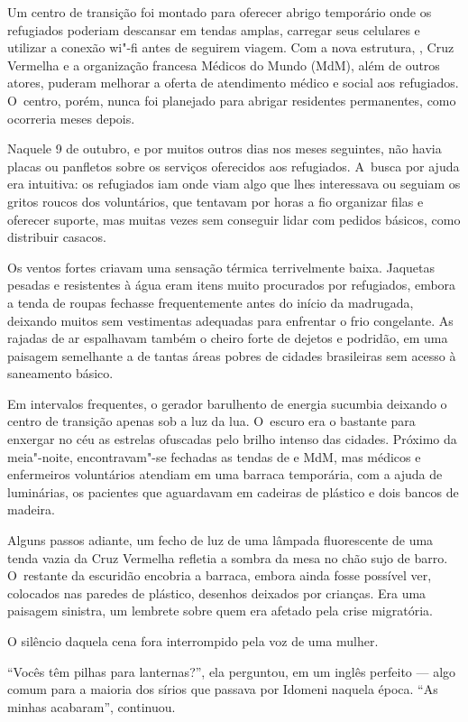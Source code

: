 Um centro de transição foi montado para oferecer abrigo temporário onde
os refugiados poderiam descansar em tendas amplas, carregar
seus celulares e utilizar a conexão wi"-fi antes de seguirem viagem. Com
a nova estrutura, , Cruz Vermelha e a organização francesa Médicos do
Mundo (MdM), além de outros atores, puderam melhorar a oferta de
atendimento médico e social aos refugiados. O~centro, porém, nunca foi
planejado para abrigar residentes permanentes, como ocorreria meses
depois.

Naquele 9 de outubro, e por muitos outros dias nos meses seguintes, não
havia placas ou panfletos sobre os serviços oferecidos aos refugiados. A~busca por ajuda era intuitiva: os refugiados iam onde viam algo que lhes
interessava ou seguiam os gritos roucos dos voluntários, que tentavam
por horas a fio organizar filas e oferecer suporte, mas muitas vezes sem
conseguir lidar com pedidos básicos, como distribuir casacos.

Os ventos fortes criavam uma sensação térmica terrivelmente baixa.
Jaquetas pesadas e resistentes à água eram itens muito procurados por
refugiados, embora a tenda de roupas fechasse frequentemente antes do
início da madrugada, deixando muitos sem vestimentas adequadas para
enfrentar o frio congelante. As rajadas de ar espalhavam também o cheiro
forte de dejetos e podridão, em uma paisagem semelhante a de tantas
áreas pobres de cidades brasileiras sem acesso à saneamento básico.

Em intervalos frequentes, o gerador barulhento de energia sucumbia
deixando o centro de transição apenas sob a luz da lua. O~escuro era o
bastante para enxergar no céu as estrelas ofuscadas pelo brilho intenso
das cidades. Próximo da meia"-noite, encontravam"-se fechadas as tendas de
 e MdM, mas médicos e enfermeiros voluntários atendiam em uma barraca
temporária, com a ajuda de  luminárias, os pacientes que
aguardavam em cadeiras de plástico e dois bancos de madeira.

Alguns passos adiante, um fecho de luz de uma lâmpada fluorescente de uma tenda vazia da Cruz Vermelha refletia a sombra da mesa no chão sujo de barro. O~restante da escuridão encobria a barraca, embora ainda
fosse possível ver, colocados nas paredes de plástico, desenhos deixados
por crianças. Era uma paisagem sinistra, um lembrete sobre
quem era afetado pela crise migratória.


O silêncio daquela cena fora interrompido pela voz de uma mulher.

``Vocês têm pilhas para lanternas?'', ela perguntou, em um inglês
perfeito --- algo comum para a maioria dos sírios que passava por
Idomeni naquela época. ``As minhas acabaram'', continuou.

